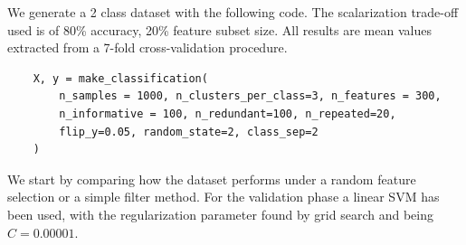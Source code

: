 We generate a 2 class dataset with the following code. The scalarization trade-off used is of 80\% accuracy, 20\% feature subset size. All results are mean values extracted from a 7-fold cross-validation procedure.

\begin{verbatim}
    X, y = make_classification(
        n_samples = 1000, n_clusters_per_class=3, n_features = 300,
        n_informative = 100, n_redundant=100, n_repeated=20,
        flip_y=0.05, random_state=2, class_sep=2
    )
\end{verbatim}

We start by comparing how the dataset performs under a random feature se\-lec\-tion or a simple filter method. For the validation phase a linear SVM has been used, with the regularization parameter found by grid search and being $C = 0.00001$.

